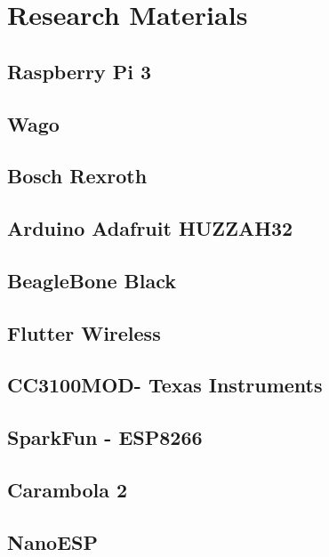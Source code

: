 \chapter{Research Materials}\label{chapter:researchmaterial}

\section{Raspberry Pi 3}
\section{Wago}
\section {Bosch Rexroth}
\section{Arduino Adafruit HUZZAH32}
\section{BeagleBone Black}
\section{Flutter Wireless}
\section{CC3100MOD- Texas Instruments}
\section{SparkFun - ESP8266}
\section{Carambola 2}
\section{NanoESP}



